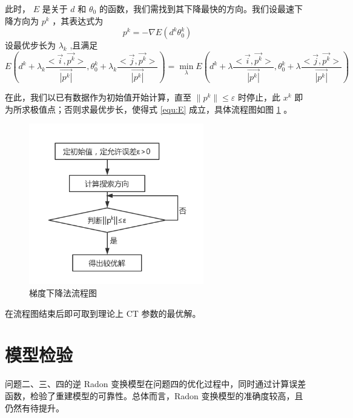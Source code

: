 \documentclass[UTF8]{ctexart}
\begin{document}
此时， $E$ 是关于 $d$ 和 $\theta_0$ 的函数，我们需找到其下降最快的方向。我们设最速下降方向为 $p^k$ ，其表达式为
$$ p^k=-\nabla E(d^k\theta_0^k) $$
设最优步长为 $\lambda_k$ ,且满足
\begin{equation}
\label{equ:E}
E(d^k+\lambda_k\dfrac{<\vec{i},\vec{p^k}>}{\vec{|p^k|}},\theta_0^k+\lambda_k\dfrac{<\vec{j},\vec{p^k}>}{\vec{|p^k|}})
  =\mathop{\min}\limits_\lambda E(d^k+\lambda\dfrac{<\vec{i},\vec{p^k}>}{\vec{|p^k|}},\theta_0^k+\lambda\dfrac{<\vec{j},\vec{p^k}>}{\vec{|p^k|}})
\end{equation} 

在此，我们以已有数据作为初始值开始计算，直至 $\|p^k\|\le\varepsilon$ 时停止，此 $x^k$ 即为所求极值点；否则求最优步长，使得式 \ref{equ:E} 成立，具体流程图如图 \ref{fig:flow} 。

\begin{figure}[htbp]
  \centering
  \includegraphics[width=3in]{../figure/flow.png}
  \caption{梯度下降法流程图}
  \label{fig:flow}
\end{figure}

在流程图结束后即可取到理论上 CT 参数的最优解。




\section{模型检验}
问题二、三、四的逆 Radon 变换模型在问题四的优化过程中，同时通过计算误差函数，检验了重建模型的可靠性。总体而言，Radon 变换模型的准确度较高，且仍然有待提升。
\end{document}
